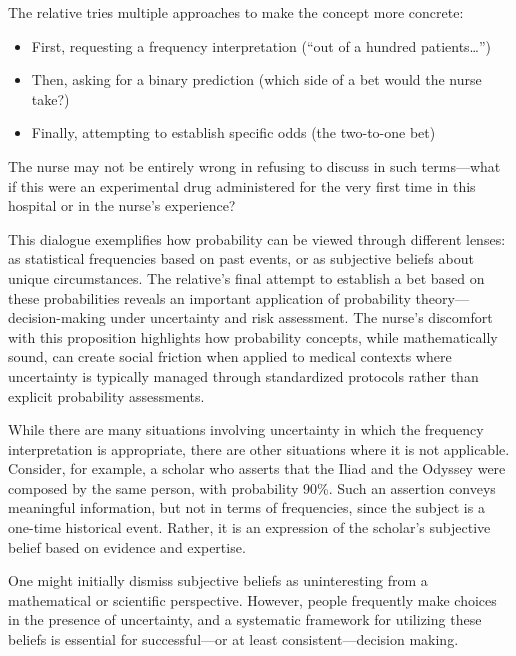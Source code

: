 The relative tries multiple approaches to make the concept more concrete:
\begin{itemize}
    \item First, requesting a frequency interpretation (``out of a hundred patients\ldots'')
    \item Then, asking for a binary prediction (which side of a bet would the nurse take?)
    \item Finally, attempting to establish specific odds (the two-to-one bet)
\end{itemize}

The nurse may not be entirely wrong in refusing to discuss in such terms—what if this were an experimental drug administered for the very first time in this hospital or in the nurse's experience? 

This dialogue exemplifies how probability can be viewed through different lenses: as statistical frequencies based on past events, or as subjective beliefs about unique circumstances. The relative's final attempt to establish a bet based on these probabilities reveals an important application of probability theory—decision-making under uncertainty and risk assessment. The nurse's discomfort with this proposition highlights how probability concepts, while mathematically sound, can create social friction when applied to medical contexts where uncertainty is typically managed through standardized protocols rather than explicit probability assessments.


While there are many situations involving uncertainty in which the frequency interpretation is appropriate, there are other situations where it is not applicable. Consider, for example, a scholar who asserts that the Iliad and the Odyssey were composed by the same person, with probability 90\%. Such an assertion conveys meaningful information, but not in terms of frequencies, since the subject is a one-time historical event. Rather, it is an expression of the scholar's subjective belief based on evidence and expertise.


One might initially dismiss subjective beliefs as uninteresting from a mathematical or scientific perspective. However, people frequently make choices in the presence of uncertainty, and a systematic framework for utilizing these beliefs is essential for successful—or at least consistent—decision making.

